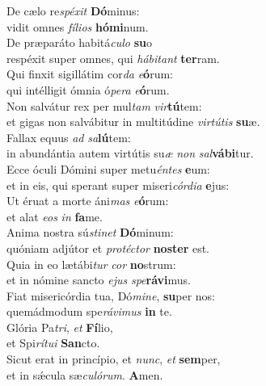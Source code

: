 \evenverse De cælo re\textit{spé}\textit{xit} \textbf{Dó}minus:~\*\\
\evenverse vidit omnes \textit{fí}\textit{li}\textit{os} \textbf{hó}\textbf{mi}num.\\
\oddverse De præparáto habitá\textit{cu}\textit{lo} \textbf{su}o~\*\\
\oddverse respéxit super omnes, qui \textit{há}\textit{bi}\textit{tant} \textbf{ter}ram.\\
\evenverse Qui finxit sigillátim cor\textit{da} \textit{e}\textbf{ó}rum:~\*\\
\evenverse qui intélligit ómnia ó\textit{pe}\textit{ra} \textit{e}\textbf{ó}rum.\\
\oddverse Non salvátur rex per mul\textit{tam} \textit{vir}\textbf{tú}tem:~\*\\
\oddverse et gigas non salvábitur in multitúdine \textit{vir}\textit{tú}\textit{tis} \textbf{su}æ.\\
\evenverse Fallax equus \textit{ad} \textit{sa}\textbf{lú}tem:~\*\\
\evenverse in abundántia autem virtútis su\textit{æ} \textit{non} \textit{sal}\textbf{vá}\textbf{bi}tur.\\
\oddverse Ecce óculi Dómini super metu\textit{én}\textit{tes} \textbf{e}um:~\*\\
\oddverse et in eis, qui sperant super miseri\textit{cór}\textit{di}\textit{a} \textbf{e}jus:\\
\evenverse Ut éruat a morte áni\textit{mas} \textit{e}\textbf{ó}rum:~\*\\
\evenverse et alat \textit{e}\textit{os} \textit{in} \textbf{fa}me.\\
\oddverse Anima nostra sú\textit{sti}\textit{net} \textbf{Dó}minum:~\*\\
\oddverse quóniam adjútor et \textit{pro}\textit{té}\textit{ctor} \textbf{no}\textbf{ster} est.\\
\evenverse Quia in eo lætábi\textit{tur} \textit{cor} \textbf{no}strum:~\*\\
\evenverse et in nómine sancto \textit{e}\textit{jus} \textit{spe}\textbf{rá}\textbf{vi}mus.\\
\oddverse Fiat misericórdia tua, Dó\textit{mi}\textit{ne}, \textbf{su}per nos:~\*\\
\oddverse quemádmodum spe\textit{rá}\textit{vi}\textit{mus} \textbf{in} te.\\
\evenverse Glória Pa\textit{tri}, \textit{et} \textbf{Fí}lio,~\*\\
\evenverse et Spi\textit{rí}\textit{tu}\textit{i} \textbf{San}cto.\\
\oddverse Sicut erat in princípio, et \textit{nunc}, \textit{et} \textbf{sem}per,~\*\\
\oddverse et in sǽcula sæ\textit{cu}\textit{ló}\textit{rum}. \textbf{A}men.\\
